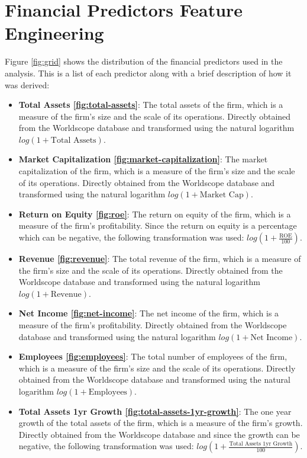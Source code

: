


\section{Financial Predictors Feature Engineering}
Figure \ref{fig:grid} shows the distribution of the financial predictors used in the analysis. This is a list of each predictor along with a brief description of how it was derived:
\begin{itemize}
    \item \textbf{Total Assets \ref{fig:total-assets}}: The total assets of the firm, which is a measure of the firm's size and the scale of its operations. Directly obtained from the Worldscope database and transformed using the natural logarithm $log(1 + \text{Total Assets})$.
    \item \textbf{Market Capitalization \ref{fig:market-capitalization}}: The market capitalization of the firm, which is a measure of the firm's size and the scale of its operations. Directly obtained from the Worldscope database and transformed using the natural logarithm $log(1 + \text{Market Cap})$.
    \item \textbf{Return on Equity \ref{fig:roe}}: The return on equity of the firm, which is a measure of the firm's profitability. Since the return on equity is a percentage which can be negative, the following transformation was used: $log(1 + \frac{\text{ROE}}{100})$.
    \item \textbf{Revenue \ref{fig:revenue}}: The total revenue of the firm, which is a measure of the firm's size and the scale of its operations. Directly obtained from the Worldscope database and transformed using the natural logarithm $log(1 + \text{Revenue})$.
    \item \textbf{Net Income \ref{fig:net-income}}: The net income of the firm, which is a measure of the firm's profitability. Directly obtained from the Worldscope database and transformed using the natural logarithm $log(1 + \text{Net Income})$.
    \item \textbf{Employees \ref{fig:employees}}: The total number of employees of the firm, which is a measure of the firm's size and the scale of its operations. Directly obtained from the Worldscope database and transformed using the natural logarithm $log(1 + \text{Employees})$.
    \item \textbf{Total Assets 1yr Growth \ref{fig:total-assets-1yr-growth}}: The one year growth of the total assets of the firm, which is a measure of the firm's growth. Directly obtained from the Worldscope database and since the growth can be negative, the following transformation was used: $log(1 + \frac{\text{Total Assets 1yr Growth}}{100})$.

\end{itemize}
